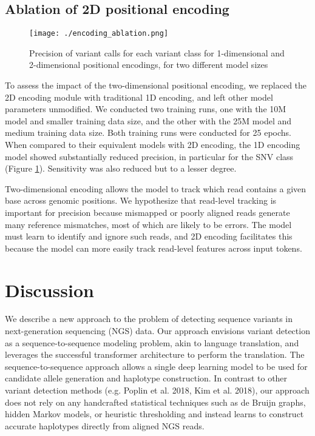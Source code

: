 \documentclass[]{article}
\begin{document}
\subsection{Ablation of 2D positional encoding}

\begin{figure}[htp]
	\texttt{[image: ./encoding\_ablation.png]}
	\caption{ Precision of variant calls for each variant class for 1-dimensional and 2-dimensional positional encodings, for two different model sizes }
	\label{fig:encoding_ablation}
\end{figure}

To assess the impact of the two-dimensional positional encoding, we replaced the 2D encoding module with traditional 1D encoding, and left other model parameters unmodified. We conducted two training runs, one with the 10M model and smaller training data size, and the other with the 25M model and medium training data size. Both training runs were conducted for 25 epochs. When compared to their equivalent models with 2D encoding, the 1D encoding model showed substantially reduced precision, in particular for the SNV class (Figure \ref{fig:encoding_ablation}). Sensitivity was also reduced but to a lesser degree. 

Two-dimensional encoding allows the model to track which read contains a given base across genomic positions. We hypothesize that read-level tracking is important for precision because mismapped or poorly aligned reads generate many reference mismatches, most of which are likely to be errors. The model must learn to identify and ignore such reads, and 2D encoding facilitates this because the model can more easily track read-level features across input tokens. 
 

\section{Discussion}

We describe a new approach to the problem of detecting sequence variants in next-generation sequencing (NGS) data. Our approach envisions variant detection as a sequence-to-sequence modeling problem, akin to language translation, and leverages the successful transformer architecture to perform the translation. The sequence-to-sequence approach allows a single deep learning model to be used for candidate allele generation and haplotype construction.  In contrast to other variant detection methods (e.g. Poplin et al. 2018,  Kim et al. 2018), our approach does not rely on any handcrafted statistical techniques such as de Bruijn graphs, hidden Markov models, or heuristic thresholding and instead learns to construct accurate haplotypes directly from aligned NGS reads. 
 
\end{document}
